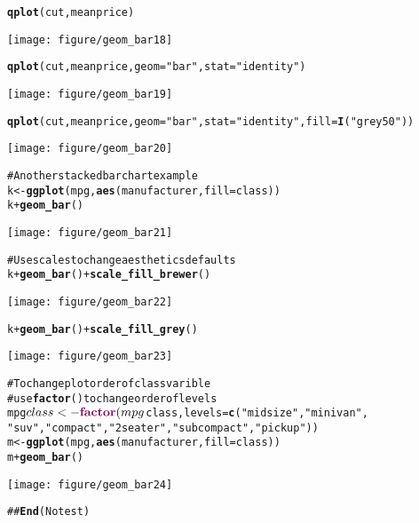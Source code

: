 \documentclass[a4paper,titlepage]{tufte-handout}\usepackage{graphicx, color}
\makeatletter
\def\maxwidth{ %
  \ifdim\Gin@nat@width>\linewidth
    \linewidth
  \else
    \Gin@nat@width
  \fi
}
\newcommand{\hlfunctioncall}[1]{\textcolor[rgb]{0.501960784313725,0,0.329411764705882}{\textbf{#1}}}%
\newcommand{\hlstring}[1]{\textcolor[rgb]{0.6,0.6,1}{#1}}%
\newcommand{\hlcomment}[1]{\textcolor[rgb]{0.180392156862745,0.6,0.341176470588235}{#1}}%
\newenvironment{kframe}{%
 \def\at@end@of@kframe{}%
 \ifinner\ifhmode%
  \def\at@end@of@kframe{\end{minipage}}%
  \begin{minipage}{\columnwidth}%
 \fi\fi%
 \def\FrameCommand##1{\hskip\@totalleftmargin \hskip-\fboxsep
 \colorbox{shadecolor}{##1}\hskip-\fboxsep
     \hskip-\linewidth \hskip-\@totalleftmargin \hskip\columnwidth}%
 \MakeFramed {\advance\hsize-\width
   \@totalleftmargin\z@ \linewidth\hsize
   \@setminipage}}%
 {\par\unskip\endMakeFramed%
 \at@end@of@kframe}
\newenvironment{knitrout}{}{} %
\makeatother
\begin{document}
\begin{knitrout}
\begin{kframe}
\begin{alltt}
\hlfunctioncall{qplot}(cut, meanprice)
\end{alltt}
\end{kframe}\texttt{[image: figure/geom\_bar18]} \begin{kframe}\begin{alltt}
\hlfunctioncall{qplot}(cut, meanprice, geom=\hlstring{"bar"}, stat=\hlstring{"identity"})
\end{alltt}
\end{kframe}\texttt{[image: figure/geom\_bar19]} \begin{kframe}\begin{alltt}
\hlfunctioncall{qplot}(cut, meanprice, geom=\hlstring{"bar"}, stat=\hlstring{"identity"}, fill = \hlfunctioncall{I}(\hlstring{"grey50"}))
\end{alltt}
\end{kframe}\texttt{[image: figure/geom\_bar20]} \begin{kframe}\begin{alltt}
\hlcomment{# Another stacked bar chart example}
k <- \hlfunctioncall{ggplot}(mpg, \hlfunctioncall{aes}(manufacturer, fill=class))
k + \hlfunctioncall{geom_bar}()
\end{alltt}
\end{kframe}\texttt{[image: figure/geom\_bar21]} \begin{kframe}\begin{alltt}
\hlcomment{# Use scales to change aesthetics defaults}
k + \hlfunctioncall{geom_bar}() + \hlfunctioncall{scale_fill_brewer}()
\end{alltt}
\end{kframe}\texttt{[image: figure/geom\_bar22]} \begin{kframe}\begin{alltt}
k + \hlfunctioncall{geom_bar}() + \hlfunctioncall{scale_fill_grey}()
\end{alltt}
\end{kframe}\texttt{[image: figure/geom\_bar23]} \begin{kframe}\begin{alltt}
\hlcomment{# To change plot order of class varible}
\hlcomment{# use \hlfunctioncall{factor}() to change order of levels}
mpg$class <- \hlfunctioncall{factor}(mpg$class, levels = \hlfunctioncall{c}(\hlstring{"midsize"}, \hlstring{"minivan"},
\hlstring{"suv"}, \hlstring{"compact"}, \hlstring{"2seater"}, \hlstring{"subcompact"}, \hlstring{"pickup"}))
m <- \hlfunctioncall{ggplot}(mpg, \hlfunctioncall{aes}(manufacturer, fill=class))
m + \hlfunctioncall{geom_bar}()
\end{alltt}
\end{kframe}\texttt{[image: figure/geom\_bar24]} \begin{kframe}\begin{alltt}
\hlcomment{## \hlfunctioncall{End}(No test)}
\end{alltt}
\end{kframe}
\end{knitrout}
\end{document}
